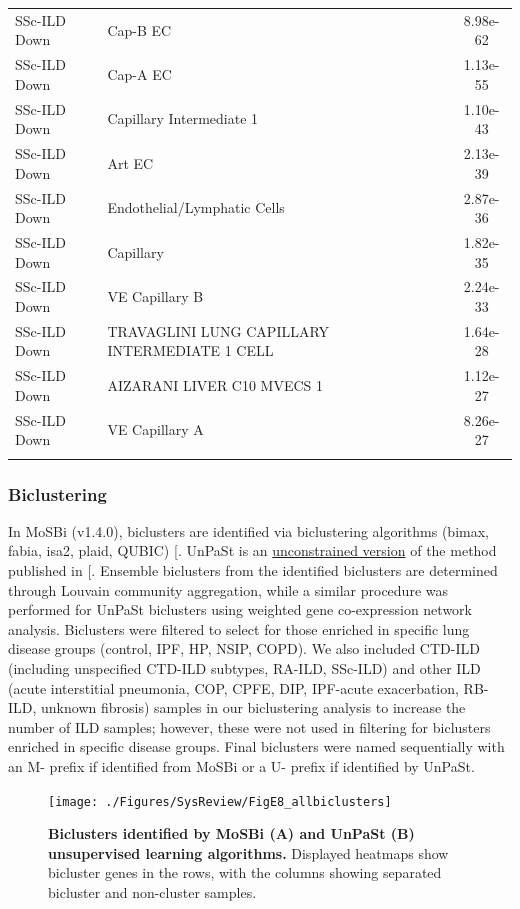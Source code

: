 \documentclass[
]{article}
\begin{document}
\begin{singlespace}
\begin{longtable}[t]{>{\raggedright\arraybackslash}p{0.8in}>{\raggedright\arraybackslash}p{4.5in}c}
\addlinespace
SSc-ILD Down & Cap-B EC & 8.98e-62\\
SSc-ILD Down & Cap-A EC & 1.13e-55\\
SSc-ILD Down & Capillary Intermediate 1 & 1.10e-43\\
SSc-ILD Down & Art EC & 2.13e-39\\
SSc-ILD Down & Endothelial/Lymphatic Cells & 2.87e-36\\
\addlinespace
SSc-ILD Down & Capillary & 1.82e-35\\
SSc-ILD Down & VE Capillary B & 2.24e-33\\
SSc-ILD Down & TRAVAGLINI LUNG CAPILLARY INTERMEDIATE 1 CELL & 1.64e-28\\
SSc-ILD Down & AIZARANI LIVER C10 MVECS 1 & 1.12e-27\\
SSc-ILD Down & VE Capillary A & 8.26e-27\\*
\end{longtable}
\endgroup{}

\end{singlespace}

\subsubsection{Biclustering}\label{biclustering-1}

In MoSBi (v1.4.0), biclusters are identified via biclustering algorithms (bimax, fabia, isa2, plaid, QUBIC) {[}\citeproc{ref-rose_mosbi_2022}{52}{]}. UnPaSt is an \href{https://github.com/ozolotareva/UnPaSt}{unconstrained version} of the method published in {[}\citeproc{ref-zolotareva_identification_2021}{53}{]}. Ensemble biclusters from the identified biclusters are determined through Louvain community aggregation, while a similar procedure was performed for UnPaSt biclusters using weighted gene co-expression network analysis. Biclusters were filtered to select for those enriched in specific lung disease groups (control, IPF, HP, NSIP, COPD). We also included CTD-ILD (including unspecified CTD-ILD subtypes, RA-ILD, SSc-ILD) and other ILD (acute interstitial pneumonia, COP, CPFE, DIP, IPF-acute exacerbation, RB-ILD, unknown fibrosis) samples in our biclustering analysis to increase the number of ILD samples; however, these were not used in filtering for biclusters enriched in specific disease groups. Final biclusters were named sequentially with an M- prefix if identified from MoSBi or a U- prefix if identified by UnPaSt.



\begin{figure}

{\centering \texttt{[image: ./Figures/SysReview/FigE8\_allbiclusters]} 

}

\caption[Biclusters]{\textbf{Biclusters identified by MoSBi (A) and UnPaSt (B) unsupervised learning algorithms.} Displayed heatmaps show bicluster genes in the rows, with the columns showing separated bicluster and non-cluster samples.}\label{fig:biclusterall}
\end{figure}
\end{document}
